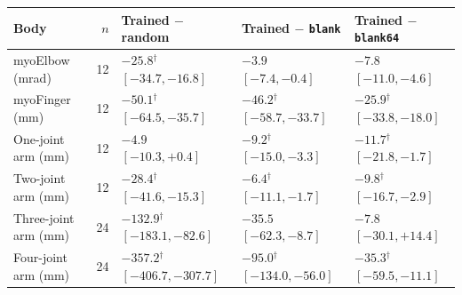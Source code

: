 \begin{tabular}{@{}lrlll@{}}
\toprule
Body & $n$ & Trained $-$ random & Trained $-$ \texttt{blank} & Trained $-$ \texttt{blank64}\\
\midrule
myoElbow (mrad) & 12 & $\mathbf{-25.8}$$^{\dagger}$ {\scriptsize$[-34.7, -16.8]$} & $\mathbf{-3.9}$ {\scriptsize$[-7.4, -0.4]$} & $\mathbf{-7.8}$ {\scriptsize$[-11.0, -4.6]$} \\
myoFinger (mm) & 12 & $\mathbf{-50.1}$$^{\dagger}$ {\scriptsize$[-64.5, -35.7]$} & $\mathbf{-46.2}$$^{\dagger}$ {\scriptsize$[-58.7, -33.7]$} & $\mathbf{-25.9}$$^{\dagger}$ {\scriptsize$[-33.8, -18.0]$} \\
One-joint arm (mm) & 12 & $-4.9$ {\scriptsize$[-10.3, +0.4]$} & $\mathbf{-9.2}$$^{\dagger}$ {\scriptsize$[-15.0, -3.3]$} & $\mathbf{-11.7}$$^{\dagger}$ {\scriptsize$[-21.8, -1.7]$} \\
Two-joint arm (mm) & 12 & $\mathbf{-28.4}$$^{\dagger}$ {\scriptsize$[-41.6, -15.3]$} & $\mathbf{-6.4}$$^{\dagger}$ {\scriptsize$[-11.1, -1.7]$} & $\mathbf{-9.8}$$^{\dagger}$ {\scriptsize$[-16.7, -2.9]$} \\
Three-joint arm (mm) & 24 & $\mathbf{-132.9}$$^{\dagger}$ {\scriptsize$[-183.1, -82.6]$} & $\mathbf{-35.5}$ {\scriptsize$[-62.3, -8.7]$} & $-7.8$ {\scriptsize$[-30.1, +14.4]$} \\
Four-joint arm (mm) & 24 & $\mathbf{-357.2}$$^{\dagger}$ {\scriptsize$[-406.7, -307.7]$} & $\mathbf{-95.0}$$^{\dagger}$ {\scriptsize$[-134.0, -56.0]$} & $\mathbf{-35.3}$$^{\dagger}$ {\scriptsize$[-59.5, -11.1]$} \\
\bottomrule
\end{tabular}
